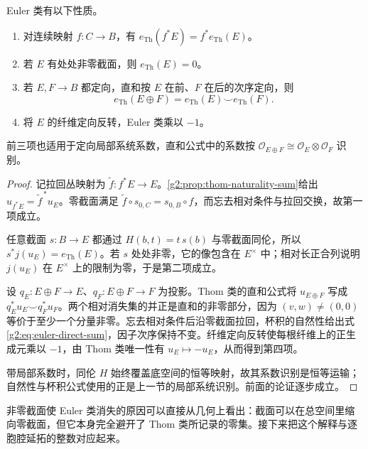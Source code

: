 \begin{proposition}\label{g2:prop:euler-basic-properties}
	Euler 类有以下性质。
	\begin{enumerate}
		\item 对连续映射 \(f:C\to B\)，有 \(e_{\mathrm{Th}}(f^*E)=f^*e_{\mathrm{Th}}(E)\)。
		\item 若 \(E\) 有处处非零截面，则 \(e_{\mathrm{Th}}(E)=0\)。
		\item 若 \(E,F\to B\) 都定向，直和按 \(E\) 在前、\(F\) 在后的次序定向，则
		\begin{equation}\label{g2:eq:euler-direct-sum}
			e_{\mathrm{Th}}(E\oplus F)=e_{\mathrm{Th}}(E)\smile e_{\mathrm{Th}}(F).
		\end{equation}
		\item 将 \(E\) 的纤维定向反转，Euler 类乘以 \(-1\)。
	\end{enumerate}
	前三项也适用于定向局部系统系数，直和公式中的系数按 \(\mathcal O_{E\oplus F}\cong\mathcal O_E\otimes\mathcal O_F\) 识别。
\end{proposition}
\begin{proof}
	记拉回丛映射为 \(\widetilde f:f^*E\to E\)。\cref{g2:prop:thom-naturality-sum}给出 \(u_{f^*E}=\widetilde f^{\,*}u_E\)。零截面满足 \(\widetilde f\circ s_{0,C}=s_{0,B}\circ f\)，而忘去相对条件与拉回交换，故第一项成立。

	任意截面 \(s:B\to E\) 都通过 \(H(b,t)=t\,s(b)\) 与零截面同伦，所以 \(s^*j(u_E)=e_{\mathrm{Th}}(E)\)。若 \(s\) 处处非零，它的像包含在 \(E^\times\) 中；相对长正合列说明 \(j(u_E)\) 在 \(E^\times\) 上的限制为零，于是第二项成立。

	设 \(q_E:E\oplus F\to E\)、\(q_F:E\oplus F\to F\) 为投影。Thom 类的直和公式将 \(u_{E\oplus F}\) 写成 \(q_E^*u_E\smile q_F^*u_F\)。两个相对消失集的并正是直和的非零部分，因为 \((v,w)\ne(0,0)\) 等价于至少一个分量非零。忘去相对条件后沿零截面拉回，杯积的自然性给出式\eqref{g2:eq:euler-direct-sum}，因子次序保持不变。纤维定向反转使每根纤维上的正生成元乘以 \(-1\)，由 Thom 类唯一性有 \(u_E\mapsto-u_E\)，从而得到第四项。

	带局部系数时，同伦 \(H\) 始终覆盖底空间的恒等映射，故其系数识别是恒等运输；自然性与杯积公式使用的正是上一节的局部系统识别。前面的论证逐步成立。
\end{proof}

非零截面使 Euler 类消失的原因可以直接从几何上看出：截面可以在总空间里缩向零截面，但它本身完全避开了 Thom 类所记录的零集。接下来把这个解释与逐胞腔延拓的整数对应起来。

